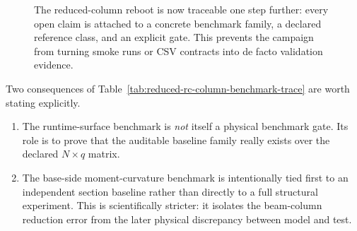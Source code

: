 \begin{figure}[htbp]
  \centering
  \caption{The reduced-column reboot is now traceable one step further:
  every open claim is attached to a concrete benchmark family, a declared
  reference class, and an explicit gate.  This prevents the campaign from
  turning smoke runs or CSV contracts into de facto validation evidence.}
  \label{fig:reduced-rc-column-benchmark-trace}
\end{figure}

Two consequences of Table~\ref{tab:reduced-rc-column-benchmark-trace} are worth
stating explicitly.
\begin{enumerate}
  \item The runtime-surface benchmark is \emph{not} itself a physical benchmark
    gate.  Its role is to prove that the auditable baseline family really
    exists over the declared \(N \times q\) matrix.
  \item The base-side moment-curvature benchmark is intentionally tied first to
    an independent section baseline rather than directly to a full structural
    experiment.  This is scientifically stricter: it isolates the beam-column
    reduction error from the later physical discrepancy between model and test.
\end{enumerate}

